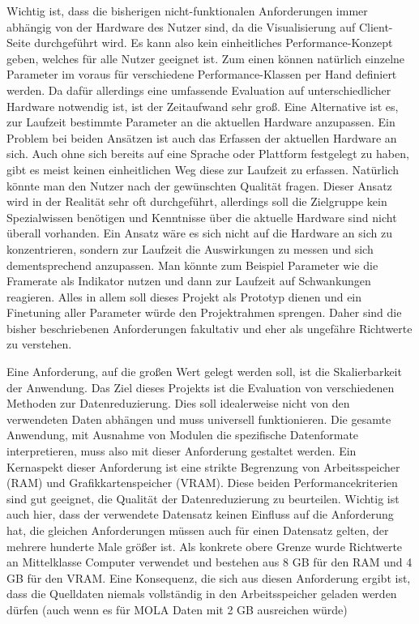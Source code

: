 Wichtig ist, dass die bisherigen nicht-funktionalen Anforderungen immer abhängig von der Hardware des Nutzer sind, da die Visualisierung auf Client-Seite durchgeführt wird. Es kann also kein einheitliches Performance-Konzept geben, welches für alle Nutzer geeignet ist. Zum einen können natürlich einzelne Parameter im voraus für verschiedene Performance-Klassen per Hand definiert werden. Da dafür allerdings eine umfassende Evaluation auf unterschiedlicher Hardware notwendig ist, ist der Zeitaufwand sehr groß. Eine Alternative ist es, zur Laufzeit bestimmte Parameter an die aktuellen Hardware anzupassen. Ein Problem bei beiden Ansätzen ist auch das Erfassen der aktuellen Hardware an sich. Auch ohne sich bereits auf eine Sprache oder Plattform festgelegt zu haben, gibt es meist keinen einheitlichen Weg diese zur Laufzeit zu erfassen. Natürlich könnte man den Nutzer nach der gewünschten Qualität fragen. Dieser Ansatz wird in der Realität sehr oft durchgeführt, allerdings soll die Zielgruppe kein Spezialwissen benötigen und Kenntnisse über die aktuelle Hardware sind nicht überall vorhanden. Ein Ansatz wäre es sich nicht auf die Hardware an sich zu konzentrieren, sondern zur Laufzeit die Auswirkungen zu messen und sich dementsprechend anzupassen. Man könnte zum Beispiel Parameter wie die Framerate als Indikator nutzen und dann zur Laufzeit auf Schwankungen reagieren. Alles in allem soll dieses Projekt als Prototyp dienen und ein Finetuning aller Parameter würde den Projektrahmen sprengen. Daher sind die bisher beschriebenen Anforderungen fakultativ und eher als ungefähre Richtwerte zu verstehen.

Eine Anforderung, auf die großen Wert gelegt werden soll, ist die Skalierbarkeit der Anwendung. Das Ziel dieses Projekts ist die Evaluation von verschiedenen Methoden zur Datenreduzierung. Dies soll idealerweise nicht von den verwendeten Daten abhängen und muss universell funktionieren. Die gesamte Anwendung, mit Ausnahme von Modulen die spezifische Datenformate interpretieren, muss also mit dieser Anforderung gestaltet werden. Ein Kernaspekt dieser Anforderung ist eine strikte Begrenzung von Arbeitsspeicher (RAM) und Grafikkartenspeicher (VRAM). Diese beiden Performancekriterien sind gut geeignet, die Qualität der Datenreduzierung zu beurteilen. Wichtig ist auch hier, dass der verwendete Datensatz keinen Einfluss auf die Anforderung hat, die gleichen Anforderungen müssen auch für einen Datensatz gelten, der mehrere hunderte Male größer ist. Als konkrete obere Grenze wurde Richtwerte an Mittelklasse Computer verwendet und bestehen aus 8 GB für den RAM und 4 GB für den VRAM. Eine Konsequenz, die sich aus diesen Anforderung ergibt ist, dass die Quelldaten niemals vollständig in den Arbeitsspeicher geladen werden dürfen (auch wenn es für MOLA Daten mit 2 GB ausreichen würde)

